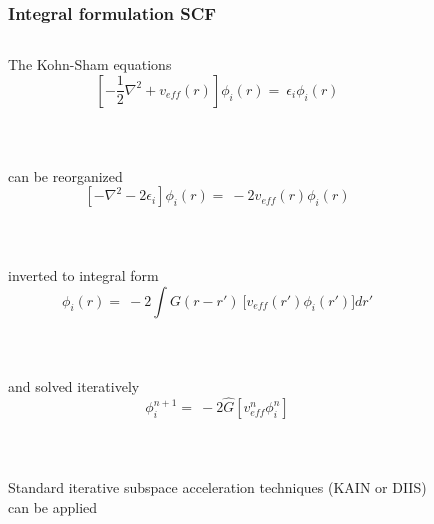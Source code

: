 \begin{frame}
    \frametitle{Integral formulation SCF}
    \begin{columns}
    \begin{column}[b]{0.4\textwidth}
    \centering
    The Kohn-Sham equations
    \begin{equation}
	\nonumber
	\left[-\frac{1}{2}\nabla^2 + v_{eff}(r)\right]
	\phi_i(r) =\ \epsilon_i \phi_i(r)
    \end{equation}
    \ \\
    \ \\
    \ \\
    can be reorganized
    \begin{equation}
	\nonumber
	\left[-\nabla^2 - 2\epsilon_i\right]\phi_i(r) =\ 
	-2v_{eff}(r)\phi_i(r)
    \end{equation}
    \ \\
    \ \\
    \ \\
    inverted to integral form
    \begin{equation}
	\nonumber
	\phi_i(r) =\ -2\int G(r-r')\
	    \Big[v_{eff}(r') \phi_i(r')\Big] dr'
    \end{equation}
    \ \\
    \ \\
    \ \\
    and solved iteratively
    \begin{equation}
	\nonumber
	\phi_i^{n+1} =\ -2\hat{G}\left[v_{eff}^n\phi_i^n\right]
    \end{equation}
    \ \\
    \ \\
    \ \\
    Standard iterative subspace acceleration techniques (KAIN or DIIS) can be applied
    \ \\
    \ \\
    \ \\
    \ \\
    \end{column}
    \begin{column}[b]{0.6\textwidth}
    \begin{figure}

\end{figure}
\end{column}
\end{columns}
\end{frame}
